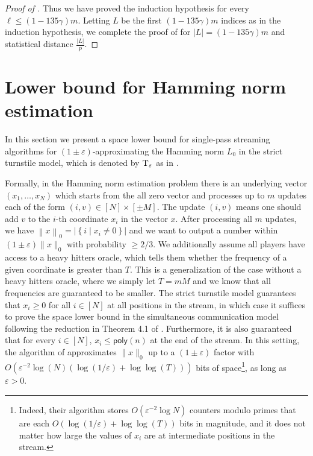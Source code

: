 \documentclass{toc}
\newcommand{\set}[1]{{\left \{{#1} \right \}}}
\newcommand{\norm}[1]{{\left\| {#1} \right \|}}
\newcommand{\st}{\;|\;}
\newcommand{\poly}{\mathsf{poly}}
\newcommand{\gap}{\ensuremath{\varepsilon}}
\newcommand{\bigo}[1]{\ensuremath{{{O} \left( {#1} \right)}}}
\newcommand{\hest}{ \textsc{T} }
\begin{document}
\begin{proof}[Proof of ]
Thus we have proved the induction hypothesis for every $\ell \le (1-135\gamma) m$.
%
Letting %
$L$ be the first $(1-135\gamma) m$ indices as in the induction hypothesis, 
we complete the proof of  for $|L|= (1-135\gamma) m$ and statistical distance $\frac{|L|}{p}$.
\end{proof}


\section{Lower bound for Hamming norm estimation}
\label{sec:lower bound L0}

In this section we present a space lower bound for single-pass streaming algorithms for $(1\pm \gap)$-approximating the Hamming norm $L_0$ in the strict turnstile model,  which is denoted by $\hest_{\gap}$ as in .

Formally, in the Hamming norm estimation problem there is an underlying vector $(x_1,\dots, x_N)$ which starts from the all zero vector and processes up to $m$ updates each of the form $(i,v)\in [N]\times [\pm M]$.
The update $(i,v)$ means one should add $v$ to the $i$-th coordinate $x_i$ in the vector $x$. 
After processing all $m$ updates, we have $\norm{x}_0 =|\set{i\st x_i\ne 0}|$ and we want to output a number within $(1\pm\gap)\|x\|_0$ with probability $\ge 2/3$. We additionally assume all players have access to a heavy hitters oracle, which tells them whether the frequency of a given coordinate is greater than $T$. This is a generalization of the case without a heavy hitters oracle, where we simply let $T = mM$ and we know that all frequencies are guaranteed to be smaller.
The strict turnstile model guarantees that $x_i \geq 0$ for all $i \in [N]$ at all positions in the stream,
in which case it suffices to prove the space lower bound in the simultaneous communication model following the reduction in Theorem 4.1 of \cite{AHLW16}.
Furthermore, it is also guaranteed that for every $i \in [N]$,  $x_i \leq \poly(n)$ at the end of the stream. 
In this setting, the algorithm of \cite{KNW10} approximates $\|x\|_0$ up to a $(1 \pm \gap)$ factor with $\bigo{\gap^{-2}\log(N) \left(\log(1/\gap) + \log \log (T) \right)}$ bits of space\footnote{Indeed, their algorithm stores $\bigo{\gap^{-2}\log N}$ counters modulo primes that are each $\bigo{\log(1/\gap) + \log \log (T)}$ bits in magnitude, and it does not matter how large the values of $x_i$ are at intermediate positions in the stream. }, as long as $\gap > 0$.
\end{document}

